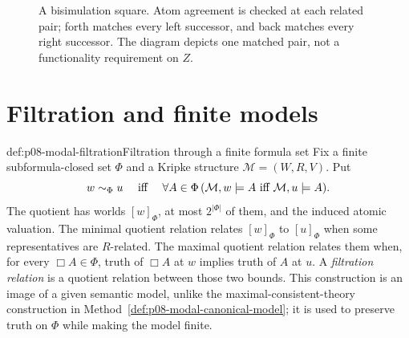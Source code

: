 \begin{figure}[!htbp]
\centering
{}
\caption{A bisimulation square.  Atom agreement is checked
at each related pair; forth matches every left successor, and back matches
every right successor.  The diagram depicts one matched pair, not a
functionality requirement on \(Z\).}
\label{fig:p08-modal-bisimulation}
\end{figure}

\section{Filtration and finite models}\label{sec:p08-modal-filtration}

\begin{hbmethod}{def:p08-modal-filtration}{Filtration through a finite formula set}
Fix a finite subformula-closed set \(\Phi\) and a Kripke structure
\(\mathcal M=(W,R,V)\).  Put
\[
 w\sim_{\Phi}u
 \quad\text{ iff }\quad
 \forall A\in\Phi\,
   (\mathcal M,w\models A\text{ iff }\mathcal M,u\models A).
\]
The quotient has worlds \([w]_{\Phi}\), at most \(2^{\lvert\Phi\rvert}\)
of them, and the induced atomic valuation.  The minimal quotient relation
relates \([w]_{\Phi}\) to \([u]_{\Phi}\) when some representatives are
\(R\)-related.  The maximal quotient relation relates them when, for every
\(\Box A\in\Phi\), truth of \(\Box A\) at \(w\) implies truth of \(A\) at
\(u\).  A \emph{filtration relation} is a quotient relation between those two
bounds.  This construction is an image of a given semantic model, unlike the
maximal-consistent-theory construction in
Method~\ref{def:p08-modal-canonical-model}; it is used to preserve truth on
\(\Phi\) while making the model finite.
\end{hbmethod}

